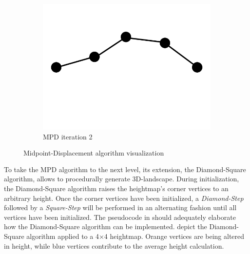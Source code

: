 \documentclass[11pt,a4paper,twoside,openright]{report}
\begin{document}
\begin{figure}[h]
\begin{subfigure}[b]{0.32\textwidth}
    \includegraphics[width=\textwidth]{mpd2.png}
    \caption{MPD iteration 2}
    \label{fig:mpd2}
  \end{subfigure}
  \caption{Midpoint-Displacement algorithm visualization}
\end{figure}

\noindent To take the MPD algorithm to the next level, its extension, the Diamond-Square algorithm, allows to procedurally generate 3D-landscape. During initialization, the Diamond-Square algorithm raises the heightmap's corner vertices to an arbitrary height. Once the corner vertices have been initialized, a \emph{Diamond-Step} followed by a \emph{Square-Step} will be performed in an alternating fashion until all vertices have been initialized. The pseudocode in  should adequately elaborate how the Diamond-Square algorithm can be implemented.  depict the Diamond-Square algorithm applied to a 4$\times$4 heightmap. Orange vertices are being altered in height, while blue vertices contribute to the average height calculation.
\end{document}

